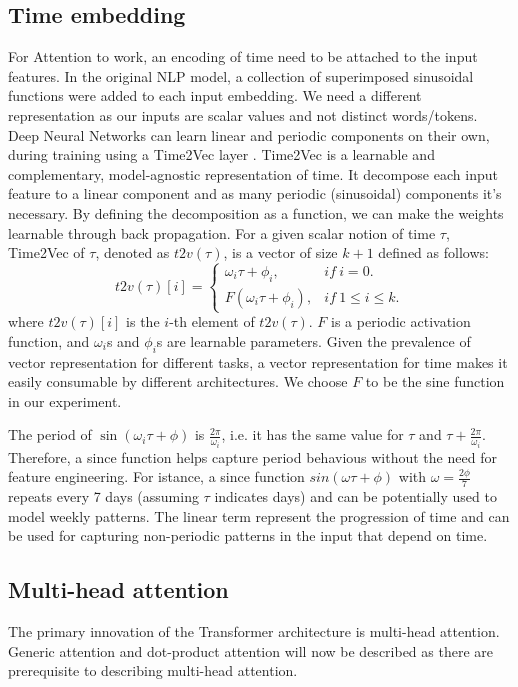 \subsection{Time embedding}
For Attention to work, an encoding of time need to be attached to the input features. In the original NLP model, a collection of superimposed sinusoidal functions were added to each input embedding. We need a different representation as our inputs are scalar values and not distinct words/tokens.
Deep Neural Networks can learn linear and periodic components on their own, during training using a Time2Vec layer \cite{time2vec}.
Time2Vec is a learnable and complementary, model-agnostic representation of time. It decompose each input feature to a linear component and as many periodic (sinusoidal) components it's necessary. By defining the decomposition as a function, we can make the weights learnable through back propagation.
For a given scalar notion of time $\tau$, Time2Vec of $\tau$, denoted as $t2v(\tau)$, is a vector of size $k+1$ defined as follows:
$$ t2v(\tau)[i] = \begin{cases}
\omega_i \tau + \phi_i, & if \ i=0. \\
F(\omega_i \tau + \phi_i), & if \ 1 \leq i \leq k.
\end{cases}
$$
where $t2v(\tau)[i]$ is the $i$-th element of $t2v(\tau)$. $F$ is a periodic activation function, and $\omega_i$s and $\phi_i$s are learnable parameters. Given the prevalence of vector representation for different tasks, a vector representation for time makes it easily consumable by different architectures. We choose $F$ to be the sine function in our experiment.

The period of $\sin(\omega_i \tau + \phi)$ is $\frac{2 \pi}{\omega_i}$, i.e. it has the same value for $\tau$ and $\tau + \frac{2\pi}{\omega_i}$. Therefore, a since function helps capture period behavious without the need for feature engineering. For istance, a since function $sin(\omega \tau + \phi)$ with $\omega=\frac{2\phi}{7}$ repeats every 7 days (assuming $\tau$ indicates days) and can be potentially used to model weekly patterns.
The linear term represent the progression of time and can be used for capturing non-periodic patterns in the input that depend on time.


\subsection{Multi-head attention}
\label{multi-head-attention}
The primary innovation of the Transformer architecture is multi-head attention. Generic attention and dot-product attention will now be described as there are prerequisite to describing multi-head attention.

